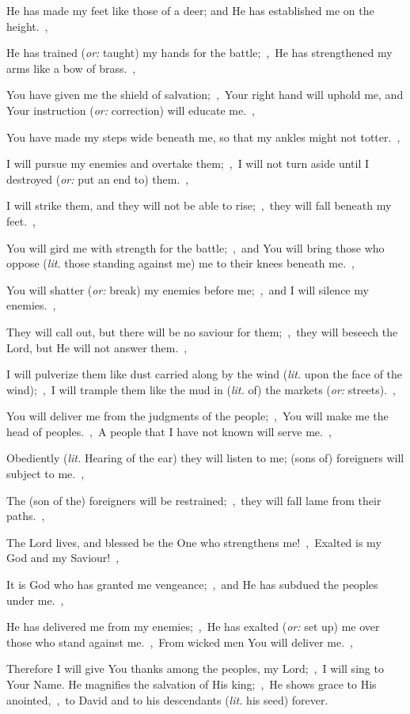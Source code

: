 \documentclass[12pt,twoside,a5paper]{article}
\newcommand{\translationoption}[1]{\emph{or:} #1}
\newcommand{\translationliteral}[1]{\emph{lit.} #1}
\begin{document}
\begin{normalparskip}
  He has made my feet like those of a deer; and He has established me on the height.~\sep

  He has trained (\translationoption{taught}) my hands for the battle;~\sep\ He has strengthened my arms like a bow of brass.~\sep

  You have given me the shield of salvation;~\sep\ Your right hand will uphold me, and Your instruction (\translationoption{correction}) will educate me.~\sep

  You have made my steps wide beneath me, so that my ankles might not totter.~\sep

  I will pursue my enemies and overtake them;~\sep\ I will not turn aside until I destroyed (\translationoption{put an end to}) them.~\sep

  I will strike them, and they will not be able to rise;~\sep\ they will fall beneath my feet.~\sep

  You will gird me with strength for the battle;~\sep\ and You will bring those who oppose (\translationliteral{those standing against me}) me to their knees beneath me.~\sep

  You will shatter (\translationoption{break}) my enemies before me;~\sep\ and I will silence my enemies.~\sep

  They will call out, but there will be no saviour for them;~\sep\ they will beseech the Lord, but He will not answer them.~\sep

  I will pulverize them like dust carried along by the wind (\translationliteral{upon the face of the wind});~\sep\ I will trample them like the mud in (\translationliteral{of}) the markets (\translationoption{streets}).~\sep

  You will deliver me from the judgments of the people;~\sep\ You will make me the head of peoples.~\sep\ A people that I have not known will serve me.~\sep

  Obediently (\translationliteral{Hearing of the ear}) they will listen to me; (sons of) foreigners will subject to me.~\sep

  The (son of the) foreigners will be restrained;~\sep\ they will fall lame from their paths.~\sep

  The Lord lives, and blessed be the One who strengthens me!~\sep\ Exalted is my God and my Saviour!~\sep

  It is God who has granted me vengeance;~\sep\ and He has subdued the peoples under me.~\sep

  He has delivered me from my enemies;~\sep\ He has exalted (\translationoption{set up}) me over those who stand against me.~\sep\ From wicked men You will deliver me.~\sep

  Therefore I will give You thanks among the peoples, my Lord;~\sep\ I will sing to Your Name. He magnifies the salvation of His king;~\sep\ He shows grace to His anointed,~\sep\ to David and to his descendants (\translationliteral{his seed}) forever.
\end{normalparskip}
\end{document}
